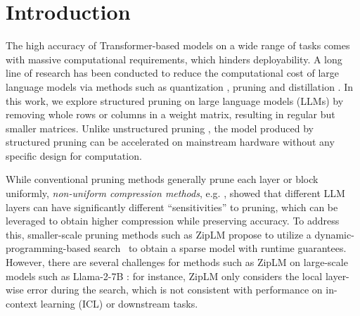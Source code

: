 \vspace{-2em}
\section{Introduction}
The high accuracy of Transformer-based models on a wide range of tasks comes with massive computational requirements, which hinders deployability. A long line of research has been conducted to reduce the computational cost of large language models via methods such as quantization \citep{frantar2022gptq, dettmers2023spqr}, pruning \citep{xia2023sheared, frantar2023sparsegpt} and distillation \cite{hsieh2023distilling}. In this work, we explore structured pruning on large language models (LLMs) by removing whole rows or columns in a weight matrix, resulting in regular but smaller matrices. Unlike unstructured pruning \citep{frantar2023sparsegpt}, the model produced by structured pruning can be accelerated on mainstream hardware without any specific design for computation. 

While conventional pruning methods generally prune each layer or block uniformly, \emph{non-uniform compression methods}, e.g. \citep{yin2023outlier, sieberling2024evopress}, showed that different LLM layers can have significantly different ``sensitivities'' to pruning, which can be leveraged to obtain higher compression while preserving accuracy. 
To address this, smaller-scale pruning methods such as ZipLM \citep{kurtic2024ziplm} propose to utilize a dynamic-programming-based search~\citep{frantar2022spdy} to obtain a sparse model with runtime guarantees. However, there are several challenges for methods such as ZipLM on large-scale models such as Llama-2-7B \citep{touvron2023llama}: for instance, ZipLM only considers the local layer-wise error during the search, which is not consistent with performance on in-context learning (ICL) or downstream tasks. 


